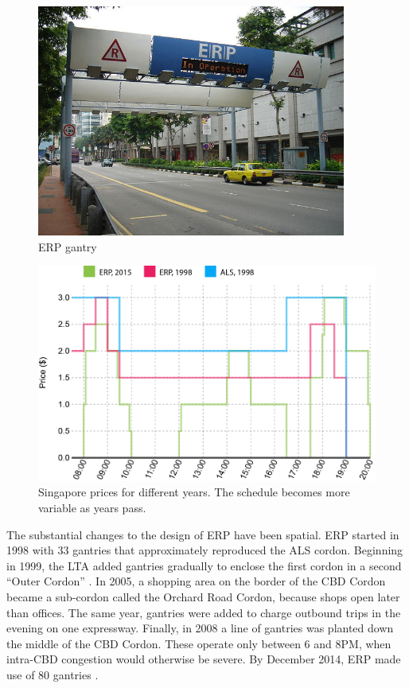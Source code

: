 \begin{figure}
	\includegraphics[width=4in]{../img/singapore-gantry.jpeg}
	\caption{ERP gantry \citep{LTA2016}}
	\label{fig:singapore-gantry}
\end{figure}


\begin{figure}
	\includegraphics[width=5in]{../img/singapore-prices.png}
	\caption{Singapore prices for different years. The schedule becomes more variable as years pass. }
	\label{fig:singapore-toll-schedule}
\end{figure}

The substantial changes to the design of ERP have been spatial. ERP started in 1998 with 33 gantries that approximately reproduced the ALS cordon. Beginning in 1999, the LTA added gantries gradually to enclose the first cordon in a second ``Outer Cordon'' \citep{Chin2010}. In 2005, a shopping area on the border of the CBD Cordon became a sub-cordon called the Orchard Road Cordon, because shops open later than offices. The same year, gantries were added to charge outbound trips in the evening on one expressway. Finally, in 2008 a line of gantries was planted down the middle of the CBD Cordon. These operate only between 6 and 8PM, when intra-CBD congestion would otherwise be severe. By December 2014, ERP made use of 80 gantries \citep[p. 406]{Chu2015}.

